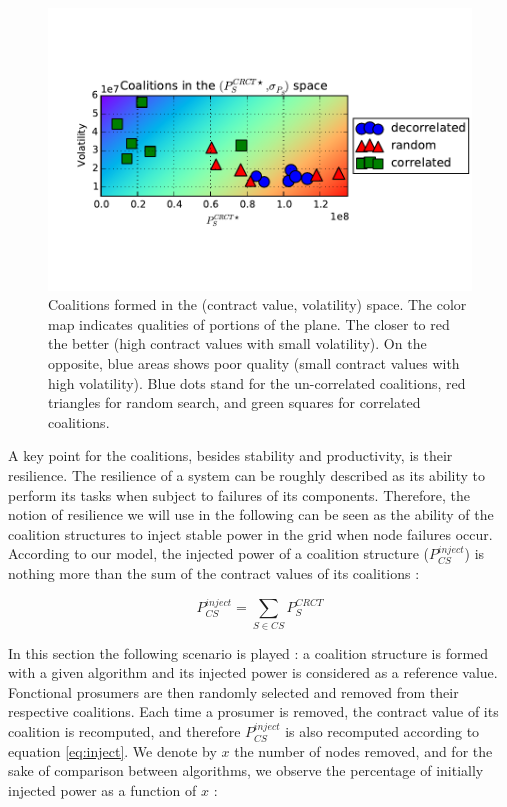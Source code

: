 \documentclass[conference]{IEEEtran}
\begin{document}
\begin{figure}
\includegraphics[scale=.6]{./figures/coalitions/coalitions.pdf}
\caption{Coalitions formed in the (contract value, volatility) space. The color map indicates qualities of portions of the plane. The closer to red the better (high contract values with small volatility). On the opposite, blue areas shows poor quality (small contract values with high volatility). Blue dots stand for the un-correlated coalitions, red triangles for random search, and green squares for correlated coalitions.}
\label{fig:coalitions}
\end{figure}

A key point for the coalitions, besides stability and productivity, is their resilience. The resilience of a system can be roughly described as its ability to perform its tasks when subject to failures of its components. Therefore, the notion of resilience we will use in the following can be seen as the ability of the coalition structures to inject stable power in the grid when node failures occur. According to our model, the injected power of a coalition structure ($ P_{CS}^{inject} $) is nothing more than the sum of the contract values of its coalitions :

\begin{equation}
P_{CS}^{inject} = \sum_{S \in CS} P_{S}^{CRCT}
\label{eq:inject}
\end{equation}

In this section the following scenario is played : a coalition structure is formed with a given algorithm and its injected power is considered as a reference value. Fonctional prosumers are then randomly selected and removed from their respective coalitions. Each time a prosumer is removed, the contract value of its coalition is recomputed, and therefore $ P_{CS}^{inject} $ is also recomputed according to equation \ref{eq:inject}. We denote by $x$ the number of nodes removed, and for the sake of comparison between algorithms, we observe the percentage of initially injected power as a function of $ x $ :
\end{document}
